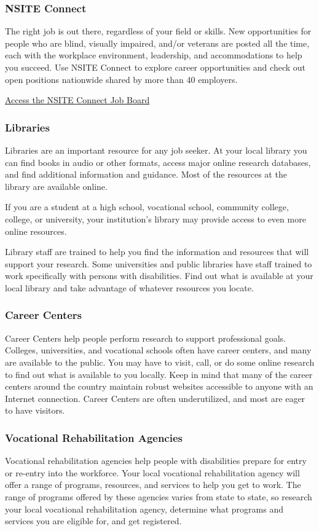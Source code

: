 \subsubsection*{NSITE Connect}
The right job is out there, regardless of your field or skills. New opportunities for people who are blind, visually impaired, and/or veterans are posted all the time, each with the workplace environment, leadership, and accommodations to help you succeed. Use NSITE Connect to explore career opportunities and check out open positions nationwide shared by more than 40 employers.

\href{https://nsiteconnect.jobboard.io/}{Access the NSITE Connect Job Board}
\subsubsection*{Libraries}

Libraries are an important resource for any job seeker. At your local library you can find books in audio or other formats, access major online research databases, and find additional information and guidance. Most of the resources at the library are available online.

If you are a student at a high school, vocational school, community college, college, or university, your institution's library may provide access to even more online resources.

Library staff are trained to help you find the information and resources that will support your research. Some universities and public libraries have staff trained to work specifically with persons with disabilities. Find out what is available at your local library and take advantage of whatever resources you locate.

\subsubsection*{Career Centers}
Career Centers help people perform research to support professional goals. Colleges, universities, and vocational schools often have career centers, and many are available to the public. You may have to visit, call, or do some online research to find out what is available to you locally. Keep in mind that many of the career centers around the country maintain robust websites accessible to anyone with an Internet connection.
Career Centers are often underutilized, and most are eager to have visitors.

\subsubsection*{Vocational Rehabilitation Agencies}
Vocational rehabilitation agencies help people with disabilities prepare for entry or re-entry into the workforce. Your local vocational rehabilitation agency will offer a range of programs, resources, and services to help you get to work. The range of programs offered by these agencies varies from state to state, so research your local vocational rehabilitation agency, determine what programs and services you are eligible for, and get registered.


